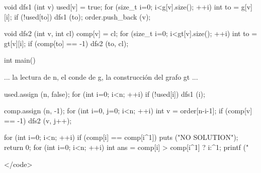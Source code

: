 void dfs1 (int v) {
used[v] = true;
for (size_t i=0; i<g[v].size(); ++i) {
int to = g[v][i];
if (!used[to])
dfs1 (to);
}
order.push_back (v);
}

void dfs2 (int v, int cl) {
comp[v] = cl;
for (size_t i=0; i<gt[v].size(); ++i) {
int to = gt[v][i];
if (comp[to] == -1)
dfs2 (to, cl);
}
}

int main() {
... la lectura de n, el conde de g, la construcción del grafo gt ...

used.assign (n, false);
for (int i=0; i<n; ++i)
if (!used[i])
dfs1 (i);

comp.assign (n, -1);
for (int i=0, j=0; i<n; ++i) {
int v = order[n-i-1];
if (comp[v] == -1)
dfs2 (v, j++);
}

for (int i=0; i<n; ++i)
if (comp[i] == comp[i^1]) {
puts ("NO SOLUTION");
return 0;
}
for (int i=0; i<n; ++i) {
int ans = comp[i] > comp[i^1] ? i:^1;
printf ("%
}

}</code>